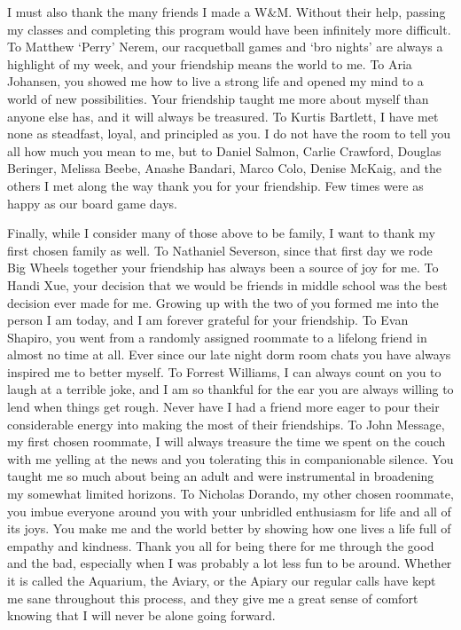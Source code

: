 \documentclass[../main.tex]{subfiles}
\begin{document}
\begin{singlespace}
{{I must also thank the many friends I made a W$\&$M. Without their help, passing my classes and completing this program would have been infinitely more difficult. To Matthew `Perry' Nerem, our racquetball games and `bro nights' are always a highlight of my week, and your friendship means the world to me. To Aria Johansen, you showed me how to live a strong life and opened my mind to a world of new possibilities. Your friendship taught me more about myself than anyone else has, and it will always be treasured. To Kurtis Bartlett, I have met none as steadfast, loyal, and principled as you. I do not have the room to tell you all how much you mean to me, but to Daniel Salmon, Carlie Crawford, Douglas Beringer, Melissa Beebe, Anashe Bandari, Marco Colo, Denise McKaig, and the others I met along the way thank you for your friendship. Few times were as happy as our board game days.\\

} %

{\parindent0pt %
                                                                                 
Finally, while I consider many of those above to be family, I want to thank my first chosen family as well. To Nathaniel Severson, since that first day we rode Big Wheels together your friendship has always been a source of joy for me. To Handi Xue, your decision that we would be friends in middle school was the best decision ever made for me. Growing up with the two of you formed me into the person I am today, and I am forever grateful for your friendship. To Evan Shapiro, you went from a randomly assigned roommate to a lifelong friend in almost no time at all. Ever since our late night dorm room chats you have always inspired me to better myself. To Forrest Williams, I can always count on you to laugh at a terrible joke, and I am so thankful for the ear you are always willing to lend when things get rough. Never have I had a friend more eager to pour their considerable energy into making the most of their friendships. To John Message, my first chosen roommate, I will always treasure the time we spent on the couch with me yelling at the news and you tolerating this in companionable silence. You taught me so much about being an adult and were instrumental in broadening my somewhat limited horizons. To Nicholas Dorando, my other chosen roommate, you imbue everyone around you with your unbridled enthusiasm for life and all of its joys. You make me and the world better by showing how one lives a life full of empathy and kindness. Thank you all for being there for me through the good and the bad, especially when I was probably a lot less fun to be around. Whether it is called the Aquarium, the Aviary, or the Apiary our regular calls have kept me sane throughout this process, and they give me a great sense of comfort knowing that I will never be alone going forward.\\

}}
\end{singlespace}
\end{document}
